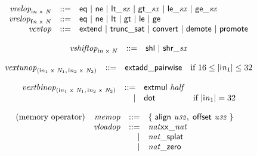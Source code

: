 $$
\begin{array}{@{}lrrl@{}l@{}}
& {{\mathit{vrelop}}}_{{\mathsf{i}}{{\mathit{n}}}~\mathsf{x}~{\mathit{N}}} &::=& \mathsf{eq} ~|~ \mathsf{ne} ~|~ {\mathsf{lt\_}}{{\mathit{sx}}} ~|~ {\mathsf{gt\_}}{{\mathit{sx}}} ~|~ {\mathsf{le\_}}{{\mathit{sx}}} ~|~ {\mathsf{ge\_}}{{\mathit{sx}}} \\
& {{\mathit{vrelop}}}_{{\mathsf{f}}{{\mathit{n}}}~\mathsf{x}~{\mathit{N}}} &::=& \mathsf{eq} ~|~ \mathsf{ne} ~|~ \mathsf{lt} ~|~ \mathsf{gt} ~|~ \mathsf{le} ~|~ \mathsf{ge} \\
& {\mathit{vcvtop}} &::=& \mathsf{extend} ~|~ \mathsf{trunc\_sat} ~|~ \mathsf{convert} ~|~ \mathsf{demote} ~|~ \mathsf{promote} \\
\end{array}
$$

$$
\begin{array}{@{}lrrl@{}l@{}}
& {{\mathit{vshiftop}}}_{{\mathsf{i}}{{\mathit{n}}}~\mathsf{x}~{\mathit{N}}} &::=& \mathsf{shl} ~|~ {\mathsf{shr\_}}{{\mathit{sx}}} \\
\end{array}
$$

$$
\begin{array}{@{}lrrl@{}l@{}}
& {{\mathit{vextunop}}}_{({{\mathsf{i}}{{\mathit{n}}}}_{{1}}~\mathsf{x}~{\mathit{N}}_{{1}},\, {{\mathsf{i}}{{\mathit{n}}}}_{{2}}~\mathsf{x}~{\mathit{N}}_{{2}})} &::=& \mathsf{extadd\_pairwise} &\quad
  \mbox{if}~16 \leq {|{{\mathsf{i}}{{\mathit{n}}}}_{{1}}|} \leq 32 \\
\end{array}
$$

$$
\begin{array}{@{}lrrl@{}l@{}}
& {{\mathit{vextbinop}}}_{({{\mathsf{i}}{{\mathit{n}}}}_{{1}}~\mathsf{x}~{\mathit{N}}_{{1}},\, {{\mathsf{i}}{{\mathit{n}}}}_{{2}}~\mathsf{x}~{\mathit{N}}_{{2}})} &::=& \mathsf{extmul}~{\mathit{half}} \\ &&|&
\mathsf{dot} &\quad
  \mbox{if}~{|{{\mathsf{i}}{{\mathit{n}}}}_{{1}}|} = 32 \\
\end{array}
$$

\vspace{1ex}

$$
\begin{array}{@{}lrrl@{}l@{}}
\mbox{(memory operator)} & {\mathit{memop}} &::=& \{\; \begin{array}[t]{@{}l@{}l@{}}
\mathsf{align}~{\mathit{u{\scriptstyle32}}},\; \mathsf{offset}~{\mathit{u{\scriptstyle32}}} \;\}\end{array} \\
& {\mathit{vloadop}} &::=& {{{{{\mathit{nat}}}{\mathsf{x}}}{\mathsf{x}}}{\mathsf{\_}}}{{\mathit{nat}}} \\ &&|&
{{{\mathit{nat}}}{\mathsf{\_}}}{\mathsf{splat}} \\ &&|&
{{{\mathit{nat}}}{\mathsf{\_}}}{\mathsf{zero}} \\
\end{array}
$$


